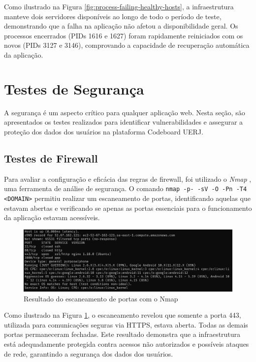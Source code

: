 Como ilustrado na Figura \ref{fig:process-failing-healthy-hosts}, a infraestrutura manteve dois servidores disponíveis ao longo de todo o período de teste, demonstrando que a falha na aplicação não afetou a disponibilidade geral. Os processos encerrados (PIDs 1616 e 1627) foram rapidamente reiniciados com os novos (PIDs 3127 e 3146), comprovando a capacidade de recuperação automática da aplicação. 


\section{Testes de Segurança}

A segurança é um aspecto crítico para qualquer aplicação web. Nesta seção, são apresentados os testes realizados para identificar vulnerabilidades e assegurar a proteção dos dados dos usuários na plataforma Codeboard UERJ.

\subsection{Testes de Firewall}

Para avaliar a configuração e eficácia das regras de firewall, foi utilizado o \emph{Nmap} \cite{nmap}, uma ferramenta de análise de segurança. O comando \texttt{nmap -p- -sV -O -Pn -T4 <DOMAIN>} permitiu realizar um escaneamento de portas, identificando aquelas que estavam abertas e verificando se apenas as portas essenciais para o funcionamento da aplicação estavam acessíveis.

\begin{figure}[H]
    \centering
    \includegraphics[width=1\textwidth]{assets/security-test/nmap-scan.png}
    \caption{Resultado do escaneamento de portas com o Nmap}
    \label{fig:nmap-scan}
\end{figure}

Como ilustrado na Figura \ref{fig:nmap-scan}, o escaneamento revelou que somente a porta 443, utilizada para comunicações seguras via HTTPS, estava aberta. Todas as demais portas permaneceram fechadas. Este resultado demonstra que a infraestrutura está adequadamente protegida contra acessos não autorizados e possíveis ataques de rede, garantindo a segurança dos dados dos usuários.

